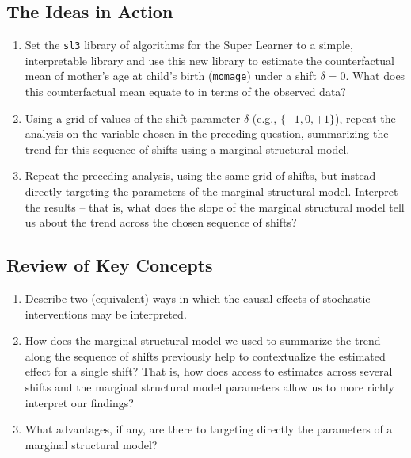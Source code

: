 \documentclass[12pt, krantz2,]{krantz}
\newcommand{\passthrough}[1]{#1}
\theoremstyle{definition}
\theoremstyle{definition}
\theoremstyle{definition}
\newcommand{\1}{\mathbbm{1}}
\begin{document}
\hypertarget{the-ideas-in-action-1}{%
\subsection{The Ideas in Action}\label{the-ideas-in-action-1}}

\begin{enumerate}
\def\labelenumi{\arabic{enumi}.}
\item
  Set the \passthrough{\lstinline!sl3!} library of algorithms for the Super Learner to a simple,
  interpretable library and use this new library to estimate the
  counterfactual mean of mother's age at child's birth (\passthrough{\lstinline!momage!}) under a
  shift \(\delta = 0\). What does this counterfactual mean equate to in terms
  of the observed data?
\item
  Using a grid of values of the shift parameter \(\delta\) (e.g., \(\{-1, 0, +1\}\)), repeat the analysis on the variable chosen in the preceding
  question, summarizing the trend for this sequence of shifts using a marginal
  structural model.
\item
  Repeat the preceding analysis, using the same grid of shifts, but instead
  directly targeting the parameters of the marginal structural model.
  Interpret the results -- that is, what does the slope of the marginal
  structural model tell us about the trend across the chosen sequence of
  shifts?
\end{enumerate}

\hypertarget{review-of-key-concepts-2}{%
\subsection{Review of Key Concepts}\label{review-of-key-concepts-2}}

\begin{enumerate}
\def\labelenumi{\arabic{enumi}.}
\item
  Describe two (equivalent) ways in which the causal effects of stochastic
  interventions may be interpreted.
\item
  How does the marginal structural model we used to summarize the trend along
  the sequence of shifts previously help to contextualize the estimated effect
  for a single shift? That is, how does access to estimates across several
  shifts and the marginal structural model parameters allow us to more richly
  interpret our findings?
\item
  What advantages, if any, are there to targeting directly the parameters of a
  marginal structural model?
\end{enumerate}
\end{document}
